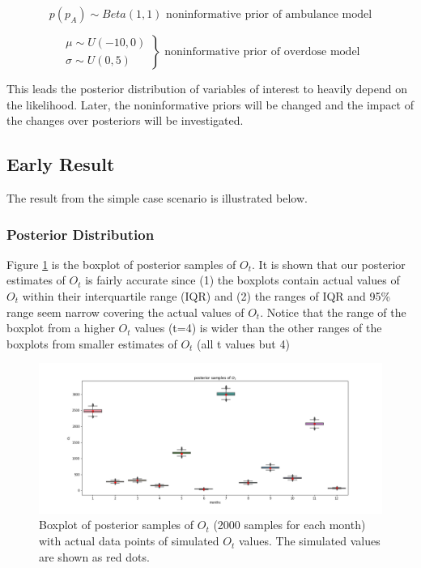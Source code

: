 \documentclass[
10pt, %
letterpaper, %
oneside, %
headinclude,footinclude, %
BCOR5mm, %
]{article}
\begin{document}
\begin{equation}
\label{nonin_prior_amb}
p(p_A) \sim Beta(1,1)
\text{			noninformative prior of ambulance model}
\end{equation} 

\begin{equation}
\label{noninprior_over}
\left.\begin{aligned}
\mu \sim U(-10,0)\\
\sigma \sim U(0,5)
\end{aligned}\right\} 
\text{			noninformative prior of overdose model}
\end{equation}

This leads the posterior distribution of variables of interest to heavily depend on the likelihood. Later, the noninformative priors will be changed and the impact of the changes over posteriors will be investigated. \\

\subsection{Early Result } 

The result from the simple case scenario is illustrated below.

\subsubsection{Posterior Distribution}


Figure \ref{pst_ot} is the boxplot of posterior samples of $O_t$. It is shown that our posterior estimates of  $O_t$ is fairly accurate since (1) the boxplots contain actual values of $O_t$ within their interquartile range (IQR) and (2) the ranges of IQR and 95\% range seem narrow covering the actual values of $O_t$. Notice that the range of the boxplot from a higher $O_t$ values (t=4) is wider than the other ranges of the boxplots from smaller estimates of $O_t$ (all t values but 4)\\

\begin{figure}[h]
	\centering
	\includegraphics[width=1\linewidth]{Figures/earlyresult1_ot.png}
	\caption{Boxplot of posterior samples of $O_t$ (2000 samples for each month) with actual data points of simulated $O_t$ values. The simulated values are shown as red dots.}
	\label{pst_ot}
\end{figure}
\end{document}
